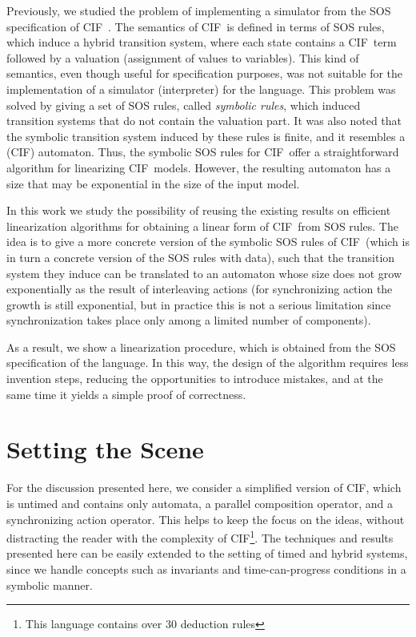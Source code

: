\documentclass[submission,copyright,creativecommons,sharealike]{eptcs}
\newcommand{\CIF}{{CIF}}
\begin{document}
Previously, we studied the problem of implementing a simulator from
the SOS specification of \CIF~\cite{NadalesReniers:DerivingSimulator11}.
The semantics of \CIF\ is defined in terms of SOS rules,
  which induce a hybrid transition system, where each state contains a
  \CIF\ term followed by a valuation (assignment of values to
  variables). This kind of semantics, even though useful for
  specification purposes, was not suitable for the implementation of a
  simulator (interpreter) for the language.
This problem was solved by giving a set of SOS rules,
called \emph{symbolic rules}, which induced transition
systems that do not contain the valuation part.
It was also
noted that the symbolic transition system induced by these rules is
finite, and it resembles a (CIF) automaton. Thus, the symbolic SOS
rules for \CIF\ offer a straightforward algorithm for linearizing
\CIF\ models. However, the resulting automaton has a size that may be
exponential in the size of the input model.

In this work we study the possibility of reusing the existing results on
efficient linearization algorithms for obtaining a linear form of
\CIF\ from
SOS rules.
The idea is to give a more concrete version of the symbolic SOS rules
of \CIF\ (which is in turn a concrete version of the SOS rules with
data), such that the transition system they induce can be translated
to an automaton whose size does not grow exponentially as the result
of interleaving actions (for synchronizing action the growth is still
exponential, but in practice this is not a serious limitation since
synchronization takes place only among a limited number of
components).

As a result, we show a linearization procedure, which is obtained
from the SOS specification of the language. In this way, the design of
the algorithm requires less invention steps, reducing the
opportunities to introduce mistakes, and at the same time it yields a
simple proof of correctness.

\section{Setting the Scene}
\label{sec:setting-scene}

For the discussion presented here, we consider a simplified version of
\CIF, which is untimed and contains only automata, a parallel
composition
operator, and a synchronizing action operator. This helps to keep the focus on the ideas, without
distracting the reader with the complexity of \CIF\footnote{This
  language contains over 30 deduction rules}. The techniques and
results presented here can be easily extended to the setting of timed
and hybrid
systems, since we handle concepts such as invariants and
time-can-progress
 conditions in a symbolic manner.
\end{document}
